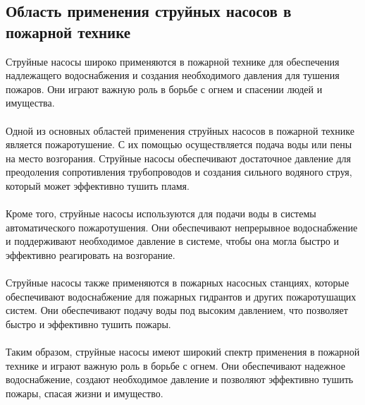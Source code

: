 \documentclass{article}
\begin{document}
\subsection{Область применения струйных насосов в пожарной технике}
Струйные насосы широко применяются в пожарной технике для обеспечения надлежащего водоснабжения и создания необходимого давления для тушения пожаров. Они играют важную роль в борьбе с огнем и спасении людей и имущества.\\
~\\
Одной из основных областей применения струйных насосов в пожарной технике является пожаротушение. С их помощью осуществляется подача воды или пены на место возгорания. Струйные насосы обеспечивают достаточное давление для преодоления сопротивления трубопроводов и создания сильного водяного струя, который может эффективно тушить пламя.\\
~\\
Кроме того, струйные насосы используются для подачи воды в системы автоматического пожаротушения. Они обеспечивают непрерывное водоснабжение и поддерживают необходимое давление в системе, чтобы она могла быстро и эффективно реагировать на возгорание.\\
~\\
Струйные насосы также применяются в пожарных насосных станциях, которые обеспечивают водоснабжение для пожарных гидрантов и других пожаротушащих систем. Они обеспечивают подачу воды под высоким давлением, что позволяет быстро и эффективно тушить пожары.\\
~\\
Таким образом, струйные насосы имеют широкий спектр применения в пожарной технике и играют важную роль в борьбе с огнем. Они обеспечивают надежное водоснабжение, создают необходимое давление и позволяют эффективно тушить пожары, спасая жизни и имущество.
\end{document}
